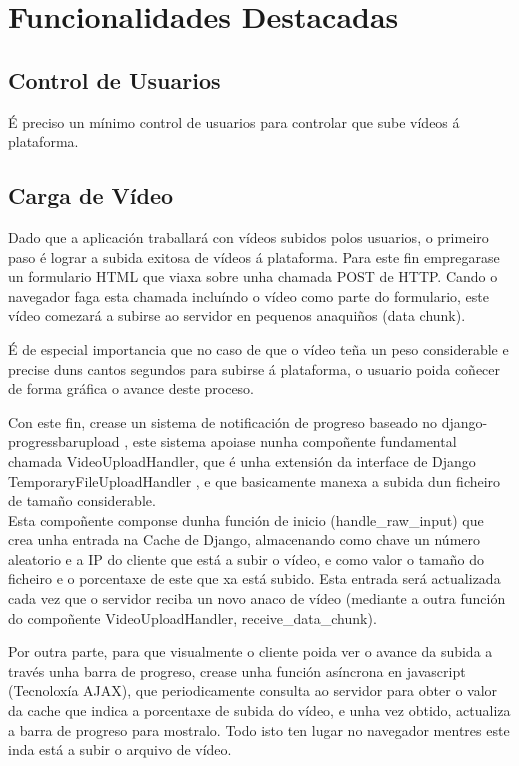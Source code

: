 \chapter{Funcionalidades Destacadas}


\section{Control de Usuarios}
	É preciso un mínimo control de usuarios para controlar que sube vídeos á plataforma.

\section{Carga de Vídeo}
	Dado que a aplicación traballará con vídeos subidos polos usuarios, o primeiro paso é lograr
	a subida exitosa de vídeos á plataforma. Para este fin empregarase un formulario HTML que 
	viaxa sobre unha chamada POST de HTTP. Cando o navegador faga esta chamada incluíndo o vídeo
	como parte do formulario, este vídeo comezará a subirse ao servidor en pequenos anaquiños 
	(data chunk).
	
	É de especial importancia que no caso de que o vídeo teña un peso considerable e precise 
	duns cantos segundos para subirse á plataforma, o usuario poida coñecer de forma gráfica
	o avance deste proceso.
	
	Con este fin, crease un sistema de notificación de progreso baseado no 
	django-progressbarupload \cite{django-progressbarupload}, este sistema apoiase nunha compoñente
	fundamental chamada VideoUploadHandler, que é unha extensión da interface de Django 
	TemporaryFileUploadHandler \cite{TemporaryFileUploadHandler}, e que basicamente manexa a subida
	dun ficheiro de tamaño considerable.\\
	
	Esta compoñente componse dunha función de inicio (handle\_raw\_input) que crea unha entrada 
	na Cache de Django, almacenando como chave un número aleatorio e a IP do cliente que está a
	subir o vídeo, e como valor o tamaño do ficheiro e o porcentaxe de este que xa está subido.
	Esta entrada será actualizada cada vez que o servidor reciba un novo anaco de vídeo (mediante
	a outra función do compoñente VideoUploadHandler, receive\_data\_chunk). 
	
	Por outra parte, para que visualmente o cliente poida ver o avance da subida a través unha
	barra de progreso, crease unha función asíncrona en javascript (Tecnoloxía AJAX), que 
	periodicamente consulta ao servidor para obter o valor da cache que indica a porcentaxe de
	subida do vídeo, e unha vez obtido, actualiza a barra de progreso para mostralo. Todo isto
	ten lugar no navegador mentres este inda está a subir o arquivo de vídeo.

